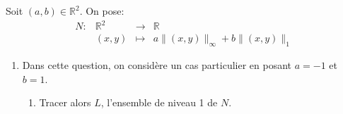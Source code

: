 \documentclass[a4paper]{tp_um}
\begin{document}
\exo{}
Soit $(a,b)\in \mathbb R^2.$ On pose:
\[
\begin{array}{rrcl} 
N: & \mathbb R^2 & \longrightarrow & \mathbb R \\
	& (x,y) & \longmapsto & a \|(x,y)\|_{\infty} + b\|(x,y)\|_1
\end{array}
\] 
\begin{enumerate}
    \item Dans cette question, on considère un cas particulier en posant $a=-1$ et $b=1$.
\begin{enumerate}
    \item Tracer alors $L$, l'ensemble de niveau 1 de $N$.  
    
		




						  

\end{enumerate}
\end{enumerate}
\end{document}

